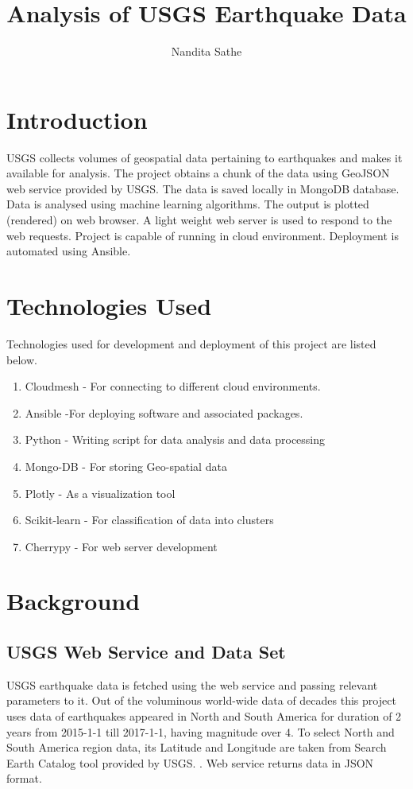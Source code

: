 \documentclass[9pt,twocolumn,twoside]{../../styles/osajnl}
\title{Analysis of USGS Earthquake Data}
\author[1,*]{Nandita Sathe}
\affil[1]{School of Informatics and Computing, Bloomington, IN 47408, U.S.A.}
\affil[*]{Corresponding authors: nsathe@iu.edu}
\begin{document}
\maketitle

\section{Introduction}

USGS collects volumes of geospatial data pertaining to earthquakes and makes it available for analysis. The project obtains a chunk of the data using GeoJSON web service provided by USGS. The data is saved locally in MongoDB database. Data is analysed using machine learning algorithms. The output is plotted (rendered) on web browser. A light weight web server is used to respond to the web requests. Project is capable of running in cloud environment. Deployment is automated using Ansible. 

\section{Technologies Used}

Technologies used for development and deployment of this project are listed below.
\begin{enumerate}

\item Cloudmesh - For connecting to different cloud environments.
\item Ansible -For deploying software and associated packages.
\item Python - Writing script for data analysis and data processing 
\item Mongo-DB - For storing Geo-spatial data
\item Plotly - As a visualization tool
\item Scikit-learn - For classification of data into clusters 
\item Cherrypy - For web server development 
\end{enumerate}

\section{Background}

\subsection{USGS Web Service and Data Set}
USGS earthquake data is fetched using the web service and passing relevant parameters to it. Out of the voluminous world-wide data of decades this project uses data of earthquakes appeared in North and South America for duration of 2 years from 2015-1-1 till 2017-1-1, having magnitude over 4. To select North and South America region data, its Latitude and Longitude are taken from Search Earth Catalog tool provided by USGS. \cite{www-usgs3}. Web service returns data in JSON format.
\end{document}
